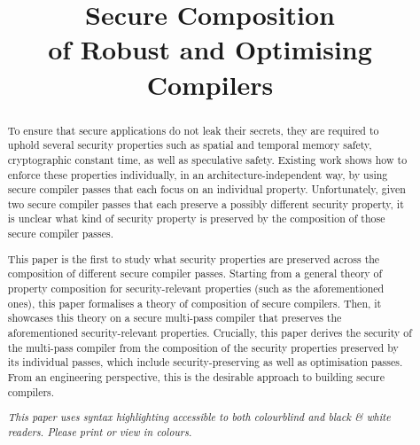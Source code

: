\documentclass[dvipsnames,conference]{IEEEtran}
\theoremstyle{definition}
\begin{document}
\linenumbers

\title{Secure Composition \\ of Robust and Optimising Compilers}

\author{\vspace*{-2em}\phantom{a}}

\maketitle

\begin{abstract}
To ensure that secure applications do not leak their secrets, they are required to uphold several security properties such as spatial and temporal memory safety, cryptographic constant time, as well as speculative safety.
Existing work shows how to enforce these properties individually, in an architecture-independent way, by using secure compiler passes that each focus on an individual property.
Unfortunately, given two secure compiler passes that each preserve a possibly different security property, it is unclear what kind of security property is preserved by the composition of those secure compiler passes.

This paper is the first to study what security properties are preserved across the composition of different secure compiler passes.
Starting from a general theory of property composition for security-relevant properties (such as the aforementioned ones), this paper formalises a theory of composition of secure compilers.
Then, it showcases this theory on a secure multi-pass compiler that preserves the aforementioned security-relevant properties.
Crucially, this paper derives the security of the multi-pass compiler from the composition of the security properties preserved by its individual passes, which include security-preserving as well as optimisation passes.
% 
From an engineering perspective, this is the desirable approach to building secure compilers.
\begin{center}\small\it
	{This paper uses syntax highlighting accessible to both colourblind and black \& white readers.
	Please print or view in colours.
	}
\end{center}
\end{abstract}
\end{document}
